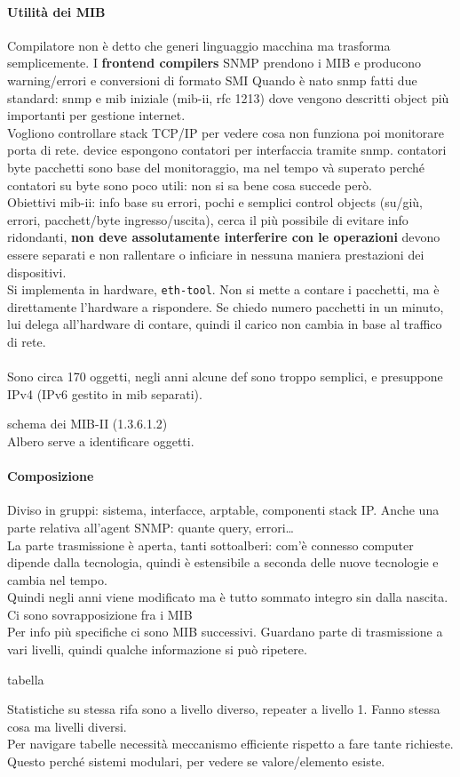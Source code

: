 \documentclass[10pt]{book}
\begin{document}
\paragraph{Utilità dei MIB} Compilatore non è detto che generi linguaggio macchina ma trasforma semplicemente. I \textbf{frontend compilers} SNMP prendono i MIB e producono warning/errori e conversioni di formato SMI
Quando è nato snmp fatti due standard: snmp e mib iniziale (mib-ii, rfc 1213) dove vengono descritti object più importanti per gestione internet.\\
Vogliono controllare stack TCP/IP per vedere cosa non funziona poi monitorare porta di rete. device espongono contatori per interfaccia tramite snmp. contatori byte pacchetti sono base del monitoraggio, ma nel tempo và superato perché contatori su byte sono poco utili: non si sa bene cosa succede però. \\
Obiettivi mib-ii: info base su errori, pochi e semplici control objects (su/giù, errori, pacchett/byte ingresso/uscita), cerca il più possibile di evitare info ridondanti, \textbf{non deve assolutamente interferire con le operazioni} devono essere separati e non rallentare o inficiare in nessuna maniera prestazioni dei dispositivi.\\
Si implementa in hardware, \texttt{eth-tool}. Non si mette a contare i pacchetti, ma è direttamente l'hardware a rispondere. Se chiedo numero pacchetti in un minuto, lui delega all'hardware di contare, quindi il carico non cambia in base al traffico di rete.\\\\
Sono circa 170 oggetti, negli anni alcune def sono troppo semplici, e presuppone IPv4 (IPv6 gestito in mib separati).
\begin{center}
	schema dei MIB-II (1.3.6.1.2)\\
	Albero serve a identificare oggetti.
\end{center}
\paragraph{Composizione} Diviso in gruppi: sistema, interfacce, arptable, componenti stack IP. Anche una parte relativa all'agent SNMP: quante query, errori\ldots\\
La parte trasmissione è aperta, tanti sottoalberi: com'è connesso computer dipende dalla tecnologia, quindi è estensibile a seconda delle nuove tecnologie e cambia nel tempo.\\
Quindi negli anni viene modificato ma è tutto sommato integro sin dalla nascita. Ci sono sovrapposizione fra i MIB\\
Per info più specifiche ci sono MIB successivi. Guardano parte di trasmissione a vari livelli, quindi qualche informazione si può ripetere.
\begin{center}
	tabella
\end{center}
Statistiche su stessa rifa sono a livello diverso, repeater a livello 1. Fanno stessa cosa ma livelli diversi.\\
Per navigare tabelle necessità meccanismo efficiente rispetto a fare tante richieste. Questo perché sistemi modulari, per vedere se valore/elemento esiste.
\end{document}

